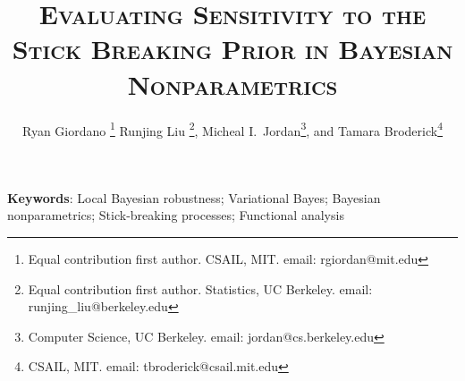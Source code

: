 \documentclass[12pt]{article}
\begin{document}

\title{\textsc{Evaluating Sensitivity to the Stick Breaking Prior in Bayesian Nonparametrics}} %



\author{
Ryan Giordano \footnote{Equal contribution first author.  CSAIL, MIT. email: rgiordan@mit.edu}
Runjing Liu \footnote{Equal contribution first author.  Statistics, UC Berkeley. email: runjing\_liu@berkeley.edu},
Micheal I.~Jordan\footnote{Computer Science, UC Berkeley. email: jordan@cs.berkeley.edu},
and Tamara Broderick\footnote{CSAIL, MIT. email: tbroderick@csail.mit.edu}\\
}

\date{\empty}
\maketitle



\begin{abstract}
    
\end{abstract}

\noindent\textbf{Keywords}:
{Local Bayesian robustness;
 Variational Bayes;
 Bayesian nonparametrics;
 Stick-breaking processes;
 Functional analysis}









\end{document}
